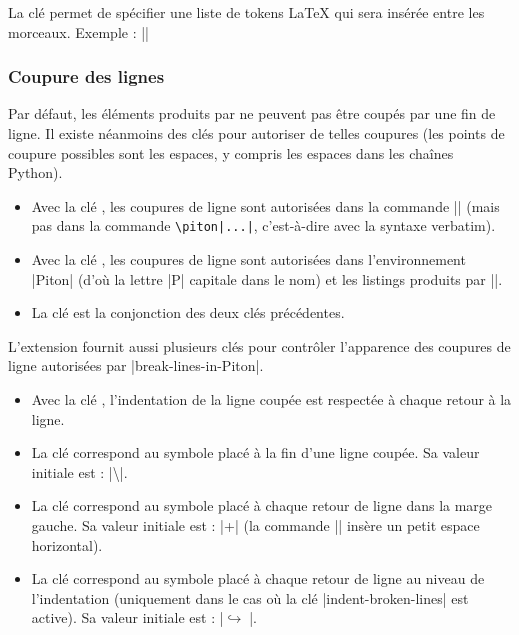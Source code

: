 \documentclass[dvipsnames,svgnames]{article}
\begin{document}
\smallskip
La clé  permet de spécifier une liste de tokens LaTeX qui sera insérée entre les
morceaux. Exemple : ||

\subsubsection{Coupure des lignes}

\label{line-breaks}

Par défaut, les éléments produits par  ne peuvent pas être coupés par une fin de ligne. Il existe
néanmoins des clés pour autoriser de telles coupures (les points de coupure possibles sont les espaces, y compris
les espaces dans les chaînes Python).
\begin{itemize}
\item {} Avec la clé , les coupures de ligne sont autorisées dans la commande
|| (mais pas dans la commande \verb+\piton|...|+, c'est-à-dire avec la syntaxe verbatim). 

\item {} Avec la clé , les coupures de ligne sont autorisées dans l'environnement
|{Piton}| (d'où la lettre |P| capitale dans le nom) et les listings produits par |\PitonInputFile|.

\item {} La clé  est la conjonction des deux clés précédentes.
\end{itemize}

\medskip
L'extension  fournit aussi plusieurs clés pour contrôler l'apparence des coupures de ligne autorisées par |break-lines-in-Piton|.

\begin{itemize}
\item {} Avec la clé , l'indentation de la ligne coupée est respectée à chaque retour
à la ligne. 

\item {} La clé  correspond au symbole placé à la fin d'une ligne coupée. Sa valeur initiale est : 
|\hspace*{0.5em}\textbackslash|.

\item {} La clé  correspond au symbole placé à chaque retour de ligne dans la marge
gauche. Sa valeur initiale est : |+\;| (la commande |\;| insère un petit espace horizontal). 

\item {} La clé  correspond au symbole placé à chaque retour de ligne
au niveau de l'indentation (uniquement dans le cas où la clé |indent-broken-lines| est active). Sa valeur initiale
est : |$\hookrightarrow\;$|.
\end{itemize}
\end{document}
